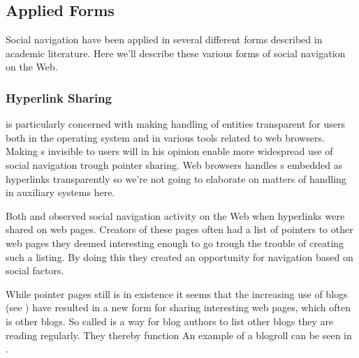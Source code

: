 \subsection{Applied Forms}

Social navigation have been applied in several different forms described in
academic literature. Here we'll describe these various forms of social
navigation on the Web.

\subsubsection{Hyperlink Sharing}

\citet{dieberger97} is particularly concerned with making handling of
%
entities transparent for users both in the operating system and in various
tools related to web browsers. Making s invisible to users will in
his opinion enable more widespread use of social navigation trough pointer
sharing. Web browsers handles s embedded as hyperlinks transparently
so we're not going to elaborate on matters of  handling in
auxiliary systems here.

Both \cite{dourish94} and \cite{dieberger97} observed social navigation
activity on the
Web when hyperlinks were shared on web pages. Creators of these pages often
had a list of pointers to other web pages they deemed interesting enough to go
trough the trouble of creating such a listing. By doing this they created
an opportunity for navigation based on social factors.

While pointer pages still is in existence it seems that the increasing
use of blogs (see )
have resulted in a new form for sharing interesting web pages,
which often is other blogs. So called  is a way for blog
authors to list other blogs they are reading regularly. They thereby function
An example of a blogroll can be seen in .

